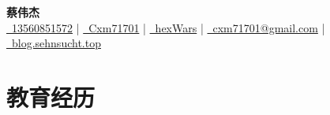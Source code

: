 \documentclass[a4paper]{article}
\begin{document}
\pagestyle{empty}



\begin{center}
    \textbf{\Huge 蔡伟杰} \\ 
    \vspace{5pt} %
    \hspace{10pt}
    \href{tel:+8613560851572}{\faPhoneVolume \ 13560851572} | 
    \href{weixin:Cxm71701}{\faWeixin \ Cxm71701} | 
    \href{https://github.com/hexWars}{\faGithub \ hexWars}  | 
    \href{mailto:xm71701@gmail.com}{\faEnvelope \ cxm71701@gmail.com} | 
    \href{https://blog.sehnsucht.top/}{\faRss \ blog.sehnsucht.top}
    
\end{center}



\section{教育经历}


\vfill
{}
\end{document}
